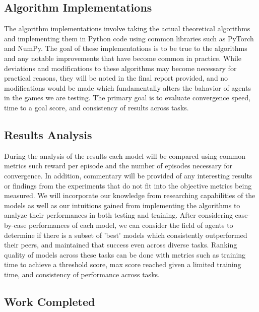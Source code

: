 \documentclass[conference]{IEEEtran}
\begin{document}
\subsection{Algorithm Implementations}
The algorithm implementations involve taking the actual theoretical algorithms and implementing them in Python code using common libraries such as PyTorch and NumPy.
The goal of these implementations is to be true to the algorithms and any notable improvements that have become common in practice.
While deviations and modifications to these algorithms may become necessary for practical reasons, they will be noted in the final report provided, and no modifications would be made which fundamentally alters the bahavior of agents in the games we are testing. The primary goal is to evaluate convergence speed, time to a goal score, and consistency of results across tasks.

\subsection{Results Analysis}
During the analysis of the results each model will be compared using common metrics such reward per episode and the number of episodes necessary for convergence.
In addition, commentary will be provided of any interesting results or findings from the experiments that do not fit into the objective metrics being measured.
We will incorporate our knowledge from researching capabilities of the models as well as our intuitions gained from implementing the algorithms to analyze their performances in both testing and training. After considering case-by-case performances of each model, we can consider the field of agents to determine if there is a subset of 'best' models which consistently outperformed their peers, and maintained that success even across diverse tasks. Ranking quality of models across these tasks can be done with metrics such as training time to achieve a threshold score, max score reached given a limited training time, and consistency of performance across tasks.

\subsection{Work Completed}
\end{document}
